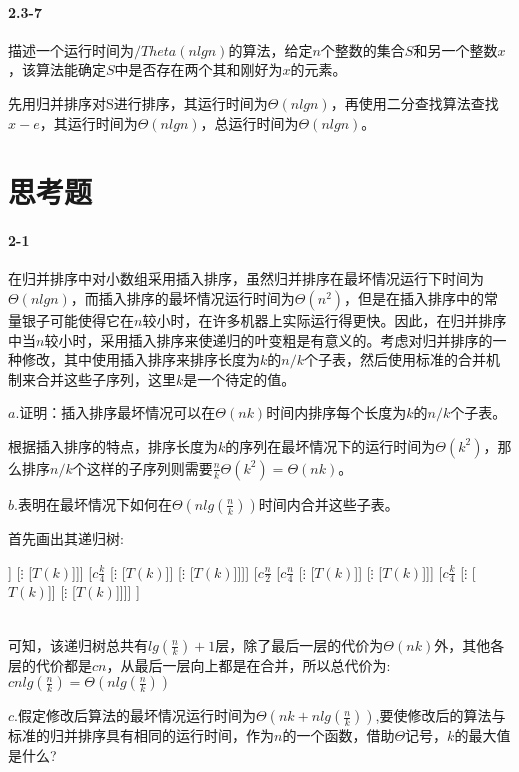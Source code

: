 \documentclass[a4paper,11pt]{article}
\begin{document}
\paragraph*{2.3-7}
描述一个运行时间为$/Theta(nlgn)$的算法，给定$n$个整数的集合$S$和另一个整数$x$，该算法能确定$S$中是否存在两个其和刚好为$x$的元素。

先用归并排序对S进行排序，其运行时间为$\Theta(nlgn)$，再使用二分查找算法查找$x-e$，其运行时间为$\Theta(nlgn)$，总运行时间为$\Theta(nlgn)$。

\section*{思考题}
\paragraph*{2-1}
在归并排序中对小数组采用插入排序，虽然归并排序在最坏情况运行下时间为$\Theta(nlgn)$，而插入排序的最坏情况运行时间为$\Theta(n^2)$，但是在插入排序中的常量银子可能使得它在$n$较小时，在许多机器上实际运行得更快。因此，在归并排序中当$n$较小时，采用插入排序来使递归的叶变粗是有意义的。考虑对归并排序的一种修改，其中使用插入排序来排序长度为$k$的$n/k$个子表，然后使用标准的合并机制来合并这些子序列，这里$k$是一个待定的值。

$a.$证明：插入排序最坏情况可以在$\Theta(nk)$时间内排序每个长度为$k$的$n/k$个子表。

根据插入排序的特点，排序长度为$k$的序列在最坏情况下的运行时间为$\Theta(k^2)$，那么排序$n/k$个这样的子序列则需要$\frac{n}{k}\Theta(k^2)=\Theta(nk)$。

$b.$表明在最坏情况下如何在$\Theta(nlg(\frac{n}{k}))$时间内合并这些子表。

首先画出其递归树:

\begin{forest}
[$cn$
	[$c\frac{n}{2}$ [$c\frac{n}{4}$ [$\vdots$ [$T(k)$]] [$\vdots$ [$T(k)$]]] [$c\frac{k}{4}$ [$\vdots$ [$T(k)$]] [$\vdots$ [$T(k)$]]]]
	[$c\frac{n}{2}$ [$c\frac{n}{4}$ [$\vdots$ [$T(k)$]] [$\vdots$ [$T(k)$]]] [$c\frac{k}{4}$ [$\vdots$ [$T(k)$]] [$\vdots$ [$T(k)$]]]]
]
\end{forest}\\
可知，该递归树总共有$lg(\frac{n}{k})+1$层，除了最后一层的代价为$\Theta(nk)$外，其他各层的代价都是$cn$，从最后一层向上都是在合并，所以总代价为:$cnlg(\frac{n}{k})=\Theta(nlg(\frac{n}{k}))$

$c.$假定修改后算法的最坏情况运行时间为$\Theta(nk+nlg(\frac{n}{k}))$,要使修改后的算法与标准的归并排序具有相同的运行时间，作为$n$的一个函数，借助$\Theta$记号，$k$的最大值是什么?
\end{document}
